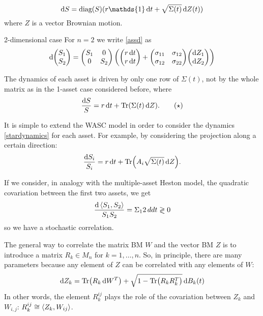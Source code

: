 \begin{equation}\label{assd}
    \dd S = \diag{S}(r\mathds{1}\,\dd t + \sqrt{\Sigma(t)}\,\dd Z(t))
\end{equation}
where $Z$ is a vector Brownian motion.
\begin{example}{2-dimensional case}{}{}
    For $n=2$ we write \eqref{assd} as
    \begin{align*}
        \dd\mqty(S_1 \\ S_2) = \mqty(S_1 & 0 \\ 0 & S_2)\left(\mqty(r\,\dd t \\ r\,\dd t) + \mqty(\sigma_{11} & \sigma_{12} \\ \sigma_{12} & \sigma_{22})\mqty(\dd Z_1 \\ \dd Z_2)\right)
    \end{align*}
\end{example}
\begin{remark}
    The dynamics of each asset is driven by only one row of $\Sigma(t)$, not by the whole matrix as in the 1-asset case considered before, where
    \begin{align}\label{stardynamics}
        \frac{\dd S}{S} = r\,\dd t + \Tr(\Sigma(t)\,\dd Z). \tag{$\star$}
    \end{align}
\end{remark}
\begin{remark}
    It is simple to extend the WASC model in order to consider the dynamics \eqref{stardynamics} for each asset. For example, by considering the projection along a certain direction:
    \begin{align*}
        \dfrac{\dd S_i}{S_i} = r\,\dd t + \Tr(A_i\sqrt{\Sigma(t)}\,\dd Z).
    \end{align*}
\end{remark}
\begin{remark}
    If we consider, in analogy with the multiple-asset Heston model, the quadratic covariation between the first two assets, we get
    \begin{align*}
        \frac{\dd\expval{S_1,S_2}}{S_1S_2} = \Sigma_12 \,dd t \gtrless 0
    \end{align*}
    so we have a stochastic correlation.
\end{remark}
\begin{remark}
    The general way to correlate the matrix BM $W$ and the vector BM $Z$ is to introduce a matrix $R_k\in M_n$ for $k=1,\dots,n$. So, in principle, there are many parameters because any element of $Z$ can be correlated with any elements of $W$:
    \begin{align}
        \dd Z_k = \Tr(R_k\,\dd W^T) + \sqrt{1-\Tr(R_kR_k^T)}\,\dd B_k(t)
    \end{align}
    In other words, the element $R_k^{ij}$ plays the role of the covariation between $Z_k$ and $W_{i,j}$: $R_k^{ij} \cong \expval{Z_k, W_{ij}}$.
\end{remark}
